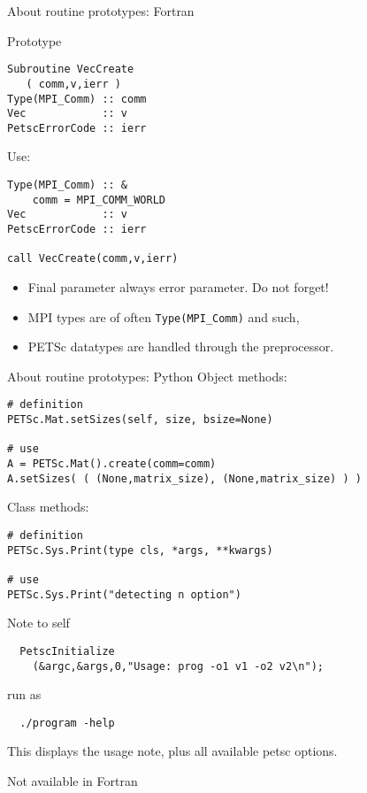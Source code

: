 \lstset{language=Fortran}
\begin{fortran}
\begin{numberedframe}{About routine prototypes: Fortran}
\begin{multicols}{2}
\footnotesize
Prototype
\begin{lstlisting}
Subroutine VecCreate
   ( comm,v,ierr )
Type(MPI_Comm) :: comm
Vec            :: v
PetscErrorCode :: ierr
\end{lstlisting}
Use:
\begin{lstlisting}
Type(MPI_Comm) :: &
    comm = MPI_COMM_WORLD
Vec            :: v
PetscErrorCode :: ierr

call VecCreate(comm,v,ierr)
\end{lstlisting}
\columnbreak
\begin{itemize}
\item Final parameter always error parameter. Do not forget!
\item MPI types are of often \lstinline{Type(MPI_Comm)} and such,
\item PETSc datatypes are handled through the preprocessor.
\end{itemize}
\hbox{}\vfill\hbox{}
\end{multicols}
\end{numberedframe}
\end{fortran}

\lstset{language=Python}
\begin{python}
\begin{numberedframe}{About routine prototypes: Python}
Object methods:
\begin{lstlisting}
# definition
PETSc.Mat.setSizes(self, size, bsize=None)

# use
A = PETSc.Mat().create(comm=comm)
A.setSizes( ( (None,matrix_size), (None,matrix_size) ) )
\end{lstlisting}

Class methods:
\begin{lstlisting}
# definition
PETSc.Sys.Print(type cls, *args, **kwargs)

# use
PETSc.Sys.Print("detecting n option")
\end{lstlisting}
\end{numberedframe}
\end{python}

\lstset{language=C}

\begin{numberedframe}{Note to self}
\begin{lstlisting}
  PetscInitialize
    (&argc,&args,0,"Usage: prog -o1 v1 -o2 v2\n");
\end{lstlisting}
run as
\begin{verbatim}
  ./program -help
\end{verbatim}
This displays the usage note, plus all available petsc options.

Not available in Fortran
\end{numberedframe}

